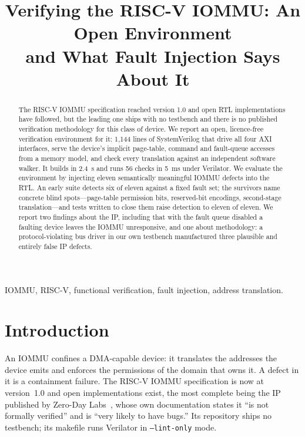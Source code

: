 \documentclass[conference]{IEEEtran}
\begin{document}
\title{Verifying the RISC-V IOMMU: An Open Environment\\and What Fault Injection Says About It}
\author{
}
\maketitle

\begin{abstract}
The RISC-V IOMMU specification reached version 1.0 and open RTL implementations
have followed, but the leading one ships with no testbench and there is no
published verification methodology for this class of device. We report an open,
licence-free verification environment for it: 1{,}144 lines of SystemVerilog
that drive all four AXI interfaces, serve the device's implicit page-table,
command and fault-queue accesses from a memory model, and check every
translation against an independent software walker. It builds in 2.4~s and runs
56 checks in 5~ms under Verilator. We evaluate the environment by injecting
eleven semantically meaningful IOMMU defects into the RTL. An early suite
detects six of eleven against a fixed fault set; the survivors name concrete
blind spots---page-table
permission bits, reserved-bit encodings, second-stage translation---and tests
written to close them raise detection to eleven of eleven. We report two
findings about the IP, including that with the fault queue disabled a faulting
device leaves the IOMMU unresponsive, and one about methodology: a
protocol-violating bus driver in our own testbench manufactured three plausible
and entirely false IP defects.
\end{abstract}

\begin{IEEEkeywords}
IOMMU, RISC-V, functional verification, fault injection, address translation.
\end{IEEEkeywords}

\section{Introduction}
An IOMMU confines a DMA-capable device: it translates the addresses the device
emits and enforces the permissions of the domain that owns it. A defect in it is
a containment failure. The RISC-V IOMMU specification is now at version~1.0 and
open implementations exist, the most complete being the IP published by Zero-Day
Labs~\cite{rviommu}, whose own documentation states it ``is not formally
verified'' and is ``very likely to have bugs.'' Its repository ships no
testbench; its makefile runs Verilator in \texttt{--lint-only} mode.
\end{document}
